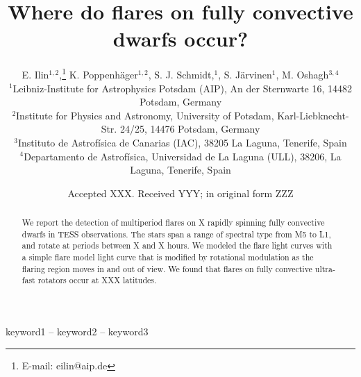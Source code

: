\documentclass[fleqn,usenatbib,letters]{mnras}%
\title[Where do flares on fully convective dwarfs occur?]{Where do flares on fully convective dwarfs occur?}
\author[E. Ilin et al.]{
E. Ilin$^{1,2}$,\thanks{E-mail: eilin@aip.de}
K. Poppenh\"ager$^{1,2}$,
S. J. Schmidt,$^{1}$,
S. J\"arvinen$^{1}$,
M. Oshagh$^{3,4}$
\\
$^{1}$Leibniz-Institute for Astrophysics Potsdam (AIP), An der Sternwarte 16, 14482 Potsdam, Germany\\
$^{2}$Institute for Physics and Astronomy, University of Potsdam, Karl-Liebknecht-Str. 24/25, 14476 Potsdam, Germany\\
$^{3}$Instituto de Astrof\'isica de Canarias (IAC), 38205 La Laguna, Tenerife, Spain\\
$^{4}$Departamento de Astrof\'isica, Universidad de La Laguna (ULL), 38206, La Laguna, Tenerife, Spain
}
\date{Accepted XXX. Received YYY; in original form ZZZ}
\begin{document}
\label{firstpage}
\pagerange{\pageref{firstpage}--\pageref{lastpage}}
\maketitle

\begin{abstract}
We report the detection of multiperiod flares on X rapidly spinning fully convective dwarfs in TESS observations. The stars span a range of spectral type from M5 to L1, and rotate at periods between X and X hours. We modeled the flare light curves with a simple flare model light curve that is modified by rotational modulation as the flaring region moves in and out of view. We found that flares on fully convective ultra-fast rotators occur at XXX latitudes.
\end{abstract}

\begin{keywords}
keyword1 -- keyword2 -- keyword3
\end{keywords}




\end{document}
